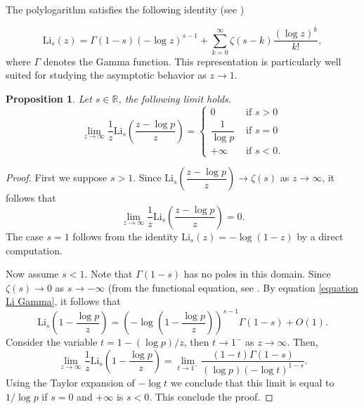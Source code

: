 \documentclass[11pt]{amsart}
\newtheorem{proposition}[theorem]{Proposition}
\theoremstyle{remark}
\numberwithin{equation}{section}
\newcommand{\R}{\mathbb{R}}
\newcommand{\Li}{\mathrm{Li}}
\begin{document}


The polylogarithm satisfies the following identity (see \cite[equation 25.12.12.]{handbookNIST}) 

\begin{equation}\label{equation Li Gamma}\Li_s(z)=\Gamma(1-s)(-\log z)^{s-1}+\sum_{k=0}^\infty \zeta(s-k)\dfrac{(\log z)^k}{k!},
\end{equation}
where $\Gamma$ denotes the Gamma function. This representation is particularly well suited for studying the asymptotic behavior as $z \to 1$.

\begin{proposition}\label{PropositionLimitLi}
    Let $s\in \R$, the following limit holds.
    \[\lim_{z\to \infty }\dfrac{1}{z}\Li_s\left(\dfrac{z-\log p}{z} \right)=\begin{cases}
        0 &\text{ if }s>0\\
        \dfrac{1}{\log p} &\text{ if }s=0\\
        +\infty &\text{ if }s<0.
    \end{cases}\]
   
\end{proposition}

\begin{proof}
    First we suppose $s>1$. Since $\Li_s\left(\dfrac{z-\log p}{z}\right)\to \zeta(s)$ as $z\to \infty$, it follows that 
    $$\lim_{z\to \infty}\dfrac{1}{z}\Li_s\left(\dfrac{z-\log p}{z} \right)=0.$$
    The case $s=1$ follows from the identity $\Li_s(z)=-\log (1-z)$ by a direct computation.

    Now assume $s<1.$ Note that $\Gamma(1-s)$ has no poles in this domain. Since $\zeta(s)\to 0$ as $s\to -\infty$ (from the functional equation, see \cite[equation 3, p.10]{edwardzetafunction}. By equation \eqref{equation Li Gamma}, it follows that \[\Li_s\left(1-\dfrac{\log p}{z} \right)= \left(-\log \left(1-\dfrac{\log p}{z} \right)\right)^{s-1}\Gamma(1-s)+O(1).\]
Consider the variable $t=1-(\log p)/z$, then $t\to 1^-$ as $z\to \infty$. Then, 
\[\lim_{z\to \infty}\dfrac{1}{z}\Li_s\left(1-\dfrac{\log p}{z}\right)=\lim_{t\to 1^{-}}\dfrac{(1-t)\Gamma(1-s)}{(\log p)  (-\log t)^{1-s}}.\]
    Using the Taylor expansion of $-\log t$ we conclude that this limit is equal to $1/\log p$ if $s=0$ and $+\infty$ is $s<0$.
    This conclude the proof.
\end{proof}
\end{document}
